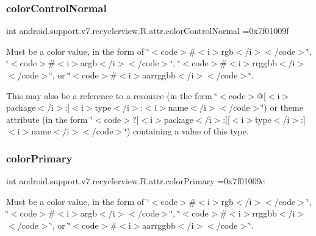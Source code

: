 \subsubsection{\texorpdfstring{color\+Control\+Normal}{colorControlNormal}}
{\footnotesize\ttfamily int android.\+support.\+v7.\+recyclerview.\+R.\+attr.\+color\+Control\+Normal =0x7f01009f\hspace{0.3cm}{\ttfamily [static]}}

Must be a color value, in the form of \char`\"{}$<$code$>$\#$<$i$>$rgb$<$/i$>$$<$/code$>$\char`\"{}, \char`\"{}$<$code$>$\#$<$i$>$argb$<$/i$>$$<$/code$>$\char`\"{}, \char`\"{}$<$code$>$\#$<$i$>$rrggbb$<$/i$>$$<$/code$>$\char`\"{}, or \char`\"{}$<$code$>$\#$<$i$>$aarrggbb$<$/i$>$$<$/code$>$\char`\"{}. 

This may also be a reference to a resource (in the form \char`\"{}$<$code$>$@\mbox{[}$<$i$>$package$<$/i$>$\+:\mbox{]}$<$i$>$type$<$/i$>$\+:$<$i$>$name$<$/i$>$$<$/code$>$\char`\"{}) or theme attribute (in the form \char`\"{}$<$code$>$?\mbox{[}$<$i$>$package$<$/i$>$\+:\mbox{]}\mbox{[}$<$i$>$type$<$/i$>$\+:\mbox{]}$<$i$>$name$<$/i$>$$<$/code$>$\char`\"{}) containing a value of this type. \mbox{\label{classandroid_1_1support_1_1v7_1_1recyclerview_1_1R_1_1attr_ae1b5ea09038701fbb0d40198261c2856}} 
\subsubsection{\texorpdfstring{color\+Primary}{colorPrimary}}
{\footnotesize\ttfamily int android.\+support.\+v7.\+recyclerview.\+R.\+attr.\+color\+Primary =0x7f01009c\hspace{0.3cm}{\ttfamily [static]}}

Must be a color value, in the form of \char`\"{}$<$code$>$\#$<$i$>$rgb$<$/i$>$$<$/code$>$\char`\"{}, \char`\"{}$<$code$>$\#$<$i$>$argb$<$/i$>$$<$/code$>$\char`\"{}, \char`\"{}$<$code$>$\#$<$i$>$rrggbb$<$/i$>$$<$/code$>$\char`\"{}, or \char`\"{}$<$code$>$\#$<$i$>$aarrggbb$<$/i$>$$<$/code$>$\char`\"{}. 

